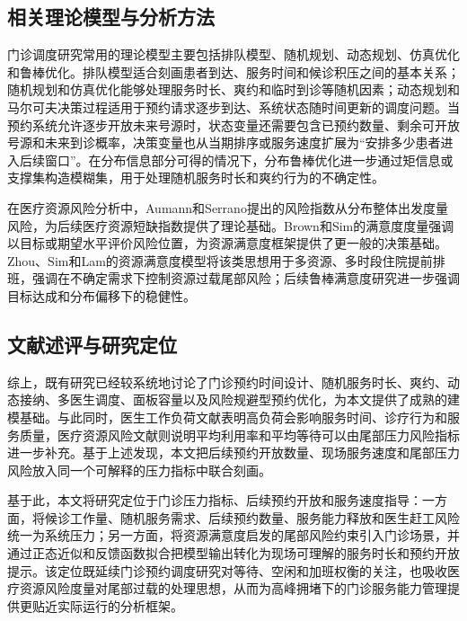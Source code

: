 \documentclass[a4paper,zihao=-4]{ctexart}
\numberwithin{figure}{section}
\numberwithin{table}{section}
\begin{document}
\subsection{相关理论模型与分析方法}

门诊调度研究常用的理论模型主要包括排队模型、随机规划、动态规划、仿真优化和鲁棒优化。排队模型适合刻画患者到达、服务时间和候诊积压之间的基本关系；随机规划和仿真优化能够处理服务时长、爽约和临时到诊等随机因素；动态规划和马尔可夫决策过程适用于预约请求逐步到达、系统状态随时间更新的调度问题\citep{DentonGupta2003,RobinsonChen2003,KlassenYoogalingam2009,BalasubramanianBiehlDaiMuriel2014,DaiGengXie2021}。当预约系统允许逐步开放未来号源时，状态变量还需要包含已预约数量、剩余可开放号源和未来到诊概率，决策变量也从当期排序或服务速度扩展为“安排多少患者进入后续窗口”。在分布信息部分可得的情况下，分布鲁棒优化进一步通过矩信息或支撑集构造模糊集，用于处理随机服务时长和爽约行为的不确定性\citep{ZhangShenErdogan2017}。

在医疗资源风险分析中，Aumann和Serrano提出的风险指数从分布整体出发度量风险，为后续医疗资源短缺指数提供了理论基础\citep{AumannSerrano2008,XieLokeSimLam2023}。Brown和Sim的满意度度量强调以目标或期望水平评价风险位置，为资源满意度框架提供了更一般的决策基础\citep{BrownSim2009}。Zhou、Sim和Lam的资源满意度模型将该类思想用于多资源、多时段住院提前排班，强调在不确定需求下控制资源过载尾部风险\citep{ZhouSimLam2022}；后续鲁棒满意度研究进一步强调目标达成和分布偏移下的稳健性\citep{LongSimZhou2023}。

\subsection{文献述评与研究定位}

综上，既有研究已经较系统地讨论了门诊预约时间设计、随机服务时长、爽约、动态接纳、多医生调度、面板容量以及风险规避型预约优化，为本文提供了成熟的建模基础。与此同时，医生工作负荷文献表明高负荷会影响服务时间、诊疗行为和服务质量，医疗资源风险文献则说明平均利用率和平均等待可以由尾部压力风险指标进一步补充。基于上述发现，本文把后续预约开放数量、现场服务速度和尾部压力风险放入同一个可解释的压力指标中联合刻画。

基于此，本文将研究定位于门诊压力指标、后续预约开放和服务速度指导：一方面，将候诊工作量、随机服务需求、后续预约数量、服务能力释放和医生赶工风险统一为系统压力；另一方面，将资源满意度启发的尾部风险约束引入门诊场景，并通过正态近似和反馈函数拟合把模型输出转化为现场可理解的服务时长和预约开放提示。该定位既延续门诊预约调度研究对等待、空闲和加班权衡的关注，也吸收医疗资源风险度量对尾部过载的处理思想，从而为高峰拥堵下的门诊服务能力管理提供更贴近实际运行的分析框架。
\end{document}
